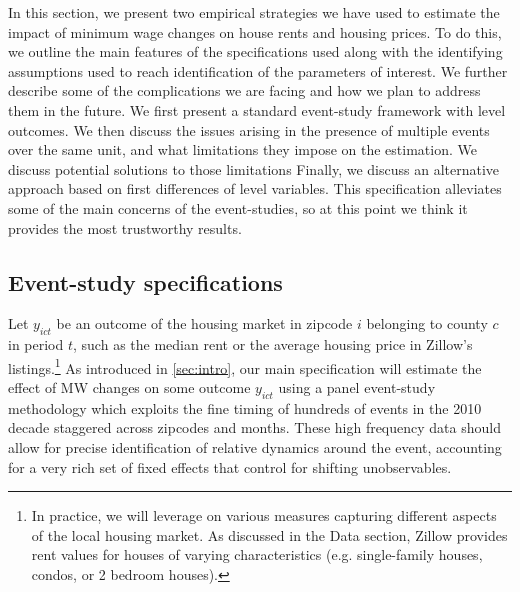 
In this section, we present two empirical strategies we have used to estimate the impact of minimum wage changes on house rents and housing prices. To do this, we outline the main features of the specifications used along with the identifying assumptions used to reach identification of the parameters of interest. We further describe some of the complications we are facing and how we plan to address them in the future. We first present a standard event-study framework with level outcomes. We then discuss the issues arising in the presence of multiple events over the same unit, and what limitations they impose on the estimation. We discuss potential solutions to those limitations Finally, we discuss an alternative approach based on first differences of level variables. This specification  alleviates some of the main concerns of the event-studies, so at this point we think it provides the most trustworthy results.

\subsection{Event-study specifications} \label{subsec:empirical_strategy/event-study}

    Let $y_{ict}$ be an outcome of the housing market in zipcode $i$ belonging to county $c$ in period $t$, such as the median rent or the average housing price in Zillow's listings.\footnote{In practice, we will leverage on various measures capturing different aspects of the local housing market. As discussed in the Data section, Zillow provides rent values for houses of varying characteristics (e.g. single-family houses, condos, or 2 bedroom houses).} As introduced in \autoref{sec:intro}, our main specification will estimate the effect of MW changes on some outcome $y_{ict}$ using a panel event-study methodology which exploits the fine timing of hundreds of events in the 2010 decade staggered across zipcodes and months. These high frequency data should allow for precise identification of relative dynamics around the event, accounting for a very rich set of fixed effects that control for shifting unobservables.
    
